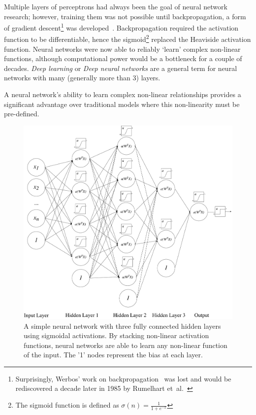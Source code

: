 \documentclass[12pt, twoside]{book}
\begin{document}
Multiple layers of perceptrons had always been the goal of neural network research; however, training them was not possible until backpropagation, a form of gradient descent\footnote{Surprisingly, Werbos' work on backpropagation~\cite{werbos1974beyond}  was lost and would be rediscovered a decade later in 1985 by Rumelhart et~al.~\cite{backproprediscover}} was developed~\cite{werbos1974beyond}. Backpropagation required the activation function to be differentiable, hence the sigmoid\footnote{The sigmoid function is defined as $\sigma(n) = \frac{1}{1+e^{-x}}$}  replaced the Heaviside activation function. Neural networks were now able to reliably `learn' complex non-linear functions, although computational power would be a bottleneck for a couple of decades. \textit{Deep learning} or \textit{Deep neural networks} are a general term for neural networks with many (generally more than 3) layers.


\begin{highlight}
A neural network's ability to learn complex non-linear relationships provides a significant advantage over traditional models where this non-linearity must be pre-defined.
\end{highlight}

\begin{figure}[h]
\centering\includegraphics[width=1\linewidth]{neuralnet.pdf}
\caption{A simple neural network with three fully connected hidden layers using sigmoidal activations. By stacking non-linear activation functions, neural networks are able to learn any non-linear function of the input. The '1' nodes represent the bias at each layer.}
\label{nnetstacked}
\end{figure}
\end{document}
